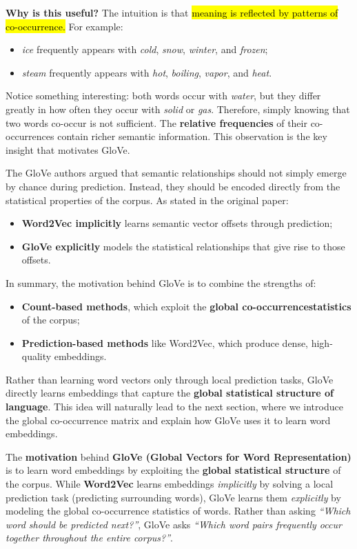 \highspace
\textcolor{Green3}{ \textbf{Why is this useful?}} The intuition is that \hl{meaning is reflected by patterns of co-occurrence.} For example:
\begin{itemize}
    \item \emph{ice} frequently appears with \emph{cold}, \emph{snow}, \emph{winter}, and \emph{frozen};
    \item \emph{steam} frequently appears with \emph{hot}, \emph{boiling}, \emph{vapor}, and \emph{heat}.
\end{itemize}
Notice something interesting: both words occur with \emph{water}, but they differ greatly in how often they occur with \emph{solid} or \emph{gas}. Therefore, simply knowing that two words co-occur is not sufficient. The \textbf{relative frequencies} of their co-occurrences contain richer semantic information. This observation is the key insight that motivates GloVe.

\highspace
The GloVe authors argued that semantic relationships should not simply emerge by chance during prediction. Instead, they should be encoded directly from the statistical properties of the corpus. As stated in the original paper:
\begin{itemize}
    \item \textbf{Word2Vec implicitly} learns semantic vector offsets through prediction;
    \item \textbf{GloVe explicitly} models the statistical relationships that give rise to those offsets.
\end{itemize}

\highspace
In summary, the motivation behind GloVe is to combine the strengths of:
\begin{itemize}
    \item \textbf{Count-based methods}, which exploit the \textbf{global co-occurrence\break statistics} of the corpus;
    \item \textbf{Prediction-based methods} like Word2Vec, which produce dense, high-quality embeddings.
\end{itemize}
Rather than learning word vectors only through local prediction tasks, GloVe directly learns embeddings that capture the \textbf{global statistical structure of language}. This idea will naturally lead to the next section, where we introduce the global co-occurrence matrix and explain how GloVe uses it to learn word embeddings.

\highspace
The \textbf{motivation} behind \textbf{GloVe (Global Vectors for Word Representation)} is to learn word embeddings by exploiting the \textbf{global statistical structure} of the corpus. While \textbf{Word2Vec} learns embeddings \emph{implicitly} by solving a local prediction task (predicting surrounding words), GloVe learns them \emph{explicitly} by modeling the global co-occurrence statistics of words. Rather than asking \emph{``Which word should be predicted next?''}, GloVe asks \emph{``Which word pairs frequently occur together throughout the entire corpus?''}.